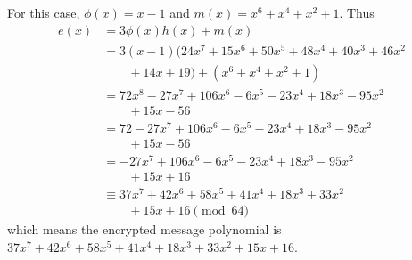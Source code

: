 \begin{questions}
    \item For this case, $\phi(x) = x - 1$ and $m(x) = x^6 + x^4 + x^2 + 1$. Thus
    \begin{align*}
        e(x) &= 3\phi(x)h(x) + m(x) \\
        &= 3(x-1)(24x^7 + 15x^6 + 50x^5 + 48x^4 + 40x^3 + 46x^2\\
        &\quad\quad+ 14x + 19) + (x^6 + x^4 + x^2 + 1)\\
        &= 72x^8 - 27x^7 + 106x^6 - 6x^5 - 23x^4 + 18x^3 - 95x^2\\
        &\quad\quad+ 15x - 56\\
        &= 72 - 27x^7 + 106x^6 - 6x^5 - 23x^4 + 18x^3 - 95x^2\\
        &\quad\quad+ 15x - 56\\
        &= -27x^7 + 106x^6 - 6x^5 - 23x^4 + 18x^3 - 95x^2\\
        &\quad\quad+ 15x + 16\\
        &\equiv 37x^7 + 42x^6 + 58x^5 + 41x^4 + 18x^3 + 33x^2\\
        &\quad\quad+ 15x + 16 \pmod{64}
    \end{align*}
    which means the encrypted message polynomial is $37x^7 + 42x^6 + 58x^5 + 41x^4 + 18x^3 + 33x^2 + 15x + 16$.


\end{questions}

